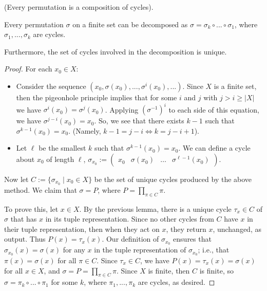 \begin{theorem}
    (Every permutation is a composition of cycles).

    Every permutation $\sigma$ on a finite set can be decomposed as $\sigma = \sigma_k \circ ... \circ \sigma_1$, where $\sigma_1, ..., \sigma_k$ are cycles. 
    
    Furthermore, the set of cycles involved in the decomposition is unique.
\end{theorem}

\begin{proof}
    For each $x_0 \in X$:

    \begin{itemize}
        \item Consider the sequence $(x_0, \sigma(x_0), ..., \sigma^i(x_0), ...)$. Since $X$ is a finite set, then the pigeonhole principle implies that for some $i$ and $j$ with $j > i \geq |X|$ we have $\sigma^i(x_0) = \sigma^j(x_0)$. Applying $(\sigma^{-1})^i$ to each side of this equation, we have $\sigma^{j - i}(x_0) = x_0$. So, we see that there exists $k - 1$ such that $\sigma^{k - 1}(x_0) = x_0$. (Namely, $k - 1 = j - i \iff k = j - i + 1$).
        \item Let $\ell$ be the smallest $k$ such that $\sigma^{k - 1}(x_0) = x_0$. We can define a cycle about $x_0$ of length $\ell$, $\sigma_{x_0} := \begin{pmatrix} x_0 & \sigma(x_0) & \hdots & \sigma^{\ell - 1}(x_0) \end{pmatrix}$.
    \end{itemize}

    Now let $C := \{ \sigma_{x_0} \mid x_0 \in X \}$ be the set of unique cycles produced by the above method. We claim that $\sigma = P$, where $P = \prod_{\pi \in C} \pi$.
    
    To prove this, let $x \in X$. By the previous lemma, there is a unique cycle $\tau_x \in C$ of $\sigma$ that has $x$ in its tuple representation. Since no other cycles from $C$ have $x$ in their tuple representation, then when they act on $x$, they return $x$, unchanged, as output. Thus $P(x) = \tau_x(x)$. Our definition of $\sigma_{x_0}$ ensures that $\sigma_{x_0}(x) = \sigma(x)$ for any $x$ in the tuple representation of $\sigma_{x_0}$; i.e., that $\pi(x) = \sigma(x)$ for all $\pi \in C$. Since $\tau_x \in C$, we have $P(x) = \tau_x(x) = \sigma(x)$ for all $x \in X$, and $\sigma = P = \prod_{\pi \in C} \pi$. Since $X$ is finite, then $C$ is finite, so $\sigma = \pi_k \circ ... \circ \pi_1$ for some $k$, where $\pi_1, ..., \pi_k$ are cycles, as desired.


\end{proof}
